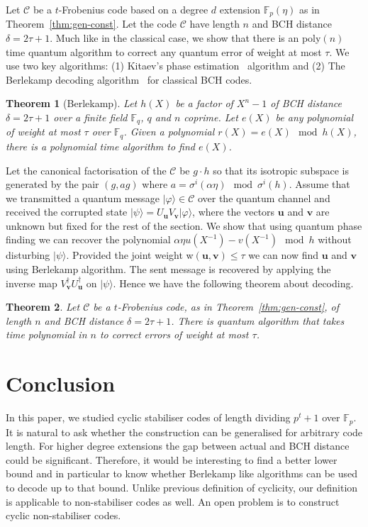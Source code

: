 \documentclass[conference]{IEEEtran}
\renewcommand{\=}{\approx}
\newcommand{\ket}[1]{|#1\rangle}
\newtheorem{theorem}{Theorem}[section]
\begin{document}
Let $\mathcal{C}$ be a $t$-Frobenius code based on a degree $d$ extension $\mathbb{F}_p(\eta)$ as in Theorem~\ref{thm:gen-const}. Let the code $\mathcal{C}$ have length $n$ and  BCH distance $\delta=2\tau +1$. Much like in the classical case, we show that there is an poly$(n)$ time quantum algorithm to correct any quantum error of weight at most $\tau$. We use two key algorithms: (1) Kitaev's
phase estimation~\cite[5.2]{nielsen:and:chuang} algorithm and (2) The
Berlekamp decoding algorithm~\cite[p-98,6.7]{vLin} for classical BCH
codes.

\begin{theorem}[Berlekamp]\label{thm:berlekamp-recast}
  Let $h(X)$ be a factor of $X^n - 1$ of BCH distance $\delta =2 \tau +1$ over
  a finite field $\mathbb{F}_q$, $q$ and $n$ coprime. Let $e(X)$ be
  any polynomial of weight at most $\tau$ over $\mathbb{F}_q$. Given a
  polynomial $r(X) = e(X) \mod h(X)$, there is a polynomial time
  algorithm to find $e(X)$.
\end{theorem}

Let the canonical factorisation of the $\mathcal{C}$ be $g\cdot h$ so that its isotropic subspace is generated by the pair $(g,ag)$ where $a = \sigma^i(\alpha\eta) \mod \sigma^i(h)$. Assume that we
transmitted a quantum message $\ket{\varphi} \in \mathcal{C}$ over the
quantum channel and received the corrupted state $\ket{\psi} =
U_\mathbf{u} V_\mathbf{v} \ket{\varphi}$, where the vectors
$\mathbf{u}$ and $\mathbf{v}$ are unknown but fixed for the rest of
the section. We show that using quantum phase finding we can recover the polynomial $\alpha\eta u(X^{-1})-v(X^{-1}) \mod h$ without disturbing $\ket{\psi}$. Provided the joint weight w$(\mathbf{u},\mathbf{v})\leq \tau$ we can now find $\mathbf{u}$ and $\mathbf{v}$ using Berlekamp algorithm. The sent message is recovered by applying the
inverse map $V_\mathbf{v}^\dag U_\mathbf{u}^\dag$ on $\ket{\psi}$. Hence we have the following theorem about decoding.

\begin{theorem}\label{thm:main-decoding-theorem}
  Let $\mathcal{C}$ be a $t$-Frobenius code, as in Theorem~\ref{thm:gen-const}, of length
  $n$ and BCH distance $\delta = 2\tau+1$. There is quantum
  algorithm that takes time polynomial in $n$ to correct errors of
  weight at most $\tau$.
\end{theorem}

\section{Conclusion}
In this paper, we studied cyclic stabiliser codes of length dividing
$p^t +1$ over $\mathbb{F}_p$. It is natural to ask whether
the construction can be generalised for arbitrary code length. For 
higher degree extensions the gap between actual and BCH
distance could be significant. Therefore, it would be interesting to
find a better lower bound and in particular to know whether
Berlekamp like algorithms can be used to decode up to that
bound. Unlike previous definition of cyclicity, our definition
is applicable to non-stabiliser codes as well. An open problem is to
construct cyclic non-stabiliser codes.
\end{document}
